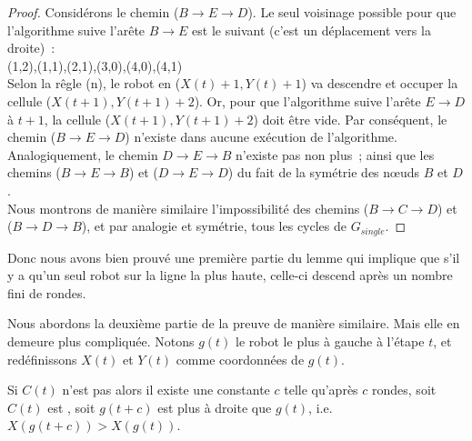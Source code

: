 \begin{proof}
Considérons le chemin ($B \rightarrow E \rightarrow D$).
Le seul voisinage possible pour que l'algorithme suive l'arête $B \rightarrow
E$ est le suivant (c'est un déplacement vers la droite)~: \\
 {{(1,2),(1,1),(2,1),(3,0),(4,0),(4,1)}} {{}} \\
Selon la rêgle (n), le robot en ($X(t)+1,Y(t)+1$) va descendre et occuper la
cellule ($X(t+1),Y(t+1)+2$). Or, pour que l'algorithme suive l'arête $E
\rightarrow D$ à $t+1$, la cellule ($X(t+1),Y(t+1)+2$) doit être vide. Par
conséquent, le chemin ($B \rightarrow E \rightarrow D$) n'existe dans aucune
exécution de l'algorithme. Analogiquement, le chemin $D \rightarrow E
\rightarrow B$ n'existe pas non plus~; ainsi que les chemins ($B \rightarrow E
\rightarrow B$) et ($D \rightarrow E \rightarrow D$) du fait de la symétrie des
n\oe{}uds $B$ et $D$. \\

Nous montrons de manière similaire l'impossibilité des chemins ($B \rightarrow
C \rightarrow D$) et ($B \rightarrow D \rightarrow B$), et par analogie et
symétrie, tous les cycles de $G_{single}$.

\end{proof}

Donc nous avons bien prouvé une première partie du lemme qui implique que s'il
y a qu'un seul robot sur la ligne la plus haute, celle-ci descend après un
nombre fini de rondes.

Nous abordons la deuxième partie de la preuve de manière similaire. Mais elle
en demeure plus compliquée. Notons $g(t)$ le robot le plus à gauche à l'étape
$t$, et redéfinissons $X(t)$ et $Y(t)$ comme coordonnées de $g(t)$.

\begin{prop}
Si $C(t)$ n'est pas \Gathered alors il existe une constante $c$ telle qu'après
$c$ rondes, soit $C(t)$ est \Gathered, soit $g(t+c)$ est plus à droite que
$g(t)$, i.e. $X(g(t+c)) > X(g(t))$.
\end{prop}


